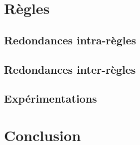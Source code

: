 \documentclass[utf8]{beamer}
\begin{document}
\section{Règles}
     
    \subsection{Redondances intra-règles}
    
    \subsection{Redondances inter-règles}
    
    \subsection{Expérimentations}
    
\section{Conclusion}
    
\end{document}
